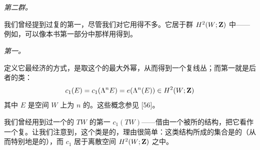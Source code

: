 
\section{\trChernClass}
\label{sec:appB-chern-classes}

\emph{第二\trCohomology{}群。}

我们曾经提到过复\trVectorBundle{}的第一\trChernClass{}，尽管我们对它用得不多。它居于\trCohomology{}群 $H^2(W;\mathbf{Z})$ 中——例如，可以像本书第一部分中那样用\trMorseComplex{}得到。

\emph{第一\trChernClass。}

定义它最经济的方式，是取这个\trFiberBundle{}的最大外幂，从而得到一个复线丛；而第一\trChernClass{}就是后者的\trEuler{}类：
\[
c_1(E) = c_1(\Lambda^n E) = e(\Lambda^n(E)) \in H^2(W;\mathbf{Z})
\]
其中 $E$ 是空间 $W$ 上\trRank{}为 $n$ 的\trFiberBundle。这些概念参见 [56]。

我们曾经用到过一个\trSymplectic\trManifold{}的\trTangentBundle{} $TW$ 的第一\trChernClass{} $c_1(TW)$——借由一个被\trSymplecticForm{}所\trCalibrated{}的\trAlmostComplex{}结构，把它看作一个复\trVectorBundle。让我们注意到，这个类是\trWellDefined{}的，理由很简单：这类\trAlmostComplex{}结构所成的集合是\trContractible{}的（从而特别地是\trConnected{}的），而\trChernClass{} $c_1$ 居于离散空间 $H^2(W;\mathbf{Z})$ 之中。
